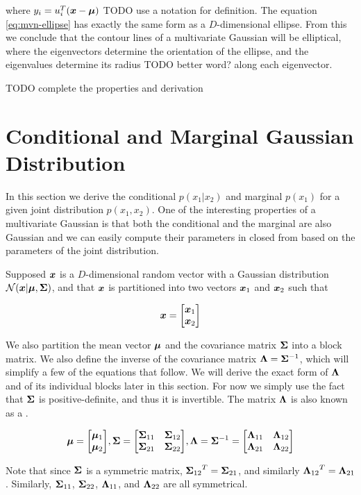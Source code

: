\begin{tcolorbox}
  where $y_i = u_{i}^{T} ({\bm{x}} - {\bm{\mu}})$ {TODO use a notation for definition}.
  The equation \eqref{eq:mvn-ellipse} has exactly the same form as a
  $D$-dimensional ellipse. From this we conclude that the contour lines of a
  multivariate Gaussian will be elliptical, where the eigenvectors determine
  the orientation of the ellipse, and the eigenvalues determine its radius
  {TODO better word?} along each eigenvector.

  {TODO complete the properties and derivation}
\end{tcolorbox}

\section{Conditional and Marginal Gaussian Distribution}

In this section we derive the conditional $p(x_1 | x_2)$ and marginal $p(x_1)$
for a given joint distribution $p(x_1, x_2)$. One of the interesting properties
of a multivariate Gaussian is that both the conditional and the marginal are
also Gaussian and we can easily compute their parameters in closed from based
on the parameters of the joint distribution.

Supposed ${\bm{x}}$ is a $D$-dimensional random vector with a Gaussian distribution
${\mathcal{N}}({\bm{x}} | {\bm{\mu}}, {\bm{\Sigma}})$, and that ${\bm{x}}$ is partitioned into two vectors
${\bm{x}}_1$ and ${\bm{x}}_2$ such that

\begin{equation}
  {\bm{x}} = {\begin{bmatrix} {\bm{x}}_1 \\ {\bm{x}}_2 \end{bmatrix}}
\end{equation}

We also partition the mean vector ${\bm{\mu}}$ and the covariance matrix ${\bm{\Sigma}}$
into a block matrix. We also define the inverse of the covariance matrix
${\bm{\Lambda}} = {\bm{\Sigma}}^{-1}$, which will simplify a few of the equations that
follow. We will derive the exact form of ${\bm{\Lambda}}$ and of its individual
blocks later in this section. For now we simply use the fact that ${\bm{\Sigma}}$ is
positive-definite, and thus it is invertible. The matrix ${\bm{\Lambda}}$ is also
known as a .

\begin{equation}
  {\bm{\mu}} = {\begin{bmatrix} {\bm{\mu}}_1 \\ {\bm{\mu}}_2 \end{bmatrix}},
  {\bm{\Sigma}} = {\begin{bmatrix} {{\bm{\Sigma}}_{11}} & {{\bm{\Sigma}}_{12}} \\ {{\bm{\Sigma}}_{21}} & {{\bm{\Sigma}}_{22}} \end{bmatrix}}, {\bm{\Lambda}} = {\bm{\Sigma}}^{-1} = {\begin{bmatrix} {{\bm{\Lambda}}_{11}} & {{\bm{\Lambda}}_{12}} \\ {{\bm{\Lambda}}_{21}} & {{\bm{\Lambda}}_{22}} \end{bmatrix}} \label{eq:mvn-partition}
\end{equation}

Note that since ${\bm{\Sigma}}$ is a symmetric matrix, ${{\bm{\Sigma}}_{12}}^T = {{\bm{\Sigma}}_{21}}$, and
similarly ${{\bm{\Lambda}}_{12}}^T = {{\bm{\Lambda}}_{21}}$. Similarly, ${{\bm{\Sigma}}_{11}}$, ${{\bm{\Sigma}}_{22}}$, ${{\bm{\Lambda}}_{11}}$,
and ${{\bm{\Lambda}}_{22}}$ are all symmetrical.

